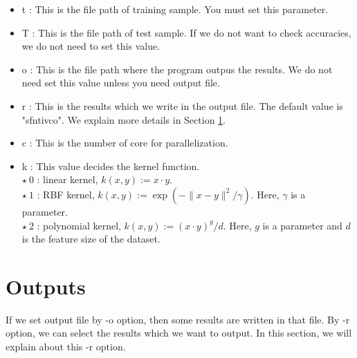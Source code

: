 \documentclass[11pt,a4paper]{article}
\begin{document}
\begin{itemize}
\item t : This is the file path of training sample. You must set this parameter.
\item T : This is the file path of test sample.
If we do not want to check accuracies, we do not need to set this value.
\item o : This is the file path where the program outpus the results. We do not need set this value unless you need output file.
\item r : This is the results which we write in the output file.
The default value is "sfntivco".
We explain more details in Section \ref{output}.
\item c : This is the number of core for parallelization.
\item k : This value decides the kernel function.\\
$ \star ~ 0$ : linear kernel, $k(x,y):=x\cdot y$.\\
$ \star ~ 1$ : RBF kernel, $k(x,y):=\exp(-\|x-y \| ^2 / \gamma)$. Here, $\gamma$ is a parameter.\\
$ \star ~ 2$ : polynomial kernel, $k(x,y):=(x\cdot y)^g / d$. Here, $g$ is a parameter and $d$ is the feature size of the dataset.

\end{itemize}



\section{Outputs}\label{output}
If we set output file by -o option,
then some results are written in that file.
By -r option, we can select the results which we want to output.
In this section,
we will explain about this -r option.
\end{document}
